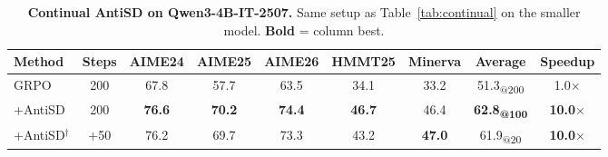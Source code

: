 \begin{table}[h]
  \caption{\textbf{Continual AntiSD on Qwen3-4B-IT-2507.} Same setup as Table~\ref{tab:continual} on the smaller model. \textbf{Bold} = column best.}
  \label{tab:continual-q4}
  \centering
  \small
  \setlength{\tabcolsep}{6pt}
  \renewcommand{\arraystretch}{1.0}
  \begin{tabular}{l|c|ccccc|c|c}
    \toprule
    \textbf{Method}                       & \textbf{Steps} & \textbf{AIME24} & \textbf{AIME25} & \textbf{AIME26} & \textbf{HMMT25} & \textbf{Minerva} & \textbf{Average}                  & \textbf{Speedup}      \\
    \midrule
    GRPO                                  & 200            & 67.8            & 57.7            & 63.5            & 34.1            & 33.2             & 51.3\textsubscript{@200}          & 1.0$\times$           \\
    +AntiSD                               & 200            & \textbf{76.6}   & \textbf{70.2}   & \textbf{74.4}   & \textbf{46.7}   & 46.4             & \textbf{62.8\textsubscript{@100}} & \textbf{10.0$\times$} \\
    \rowcolor{antisdrow} +AntiSD$^{\dag}$ & +50            & 76.2            & 69.7            & 73.3            & 43.2            & \textbf{47.0}    & 61.9\textsubscript{@20}           & \textbf{10.0$\times$} \\
    \bottomrule
  \end{tabular}
\end{table}
